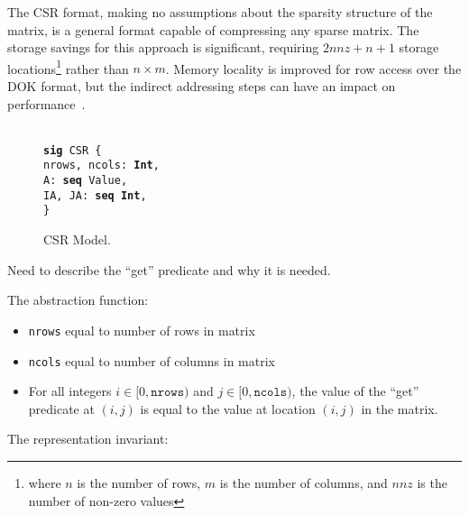 \documentclass[11pt,conference]{IEEEtran}
\newenvironment{myquote}{\list{}{\leftmargin=12pt\rightmargin=0pt}\item[]}{\endlist}
\def\TA{\makebox[12pt]{}}
\def\Bsig{\textbf{sig} }
\def\Bseq{\textbf{seq} }
\def\Bint{\textbf{Int}}
\begin{document}
The CSR format, making no assumptions about the sparsity structure of the matrix, is a general format capable of compressing any sparse matrix.  The storage savings for this approach is significant, requiring $2nnz+n+1$ storage locations\footnote{where $n$ is the number of rows, $m$ is the number of columns, and $nnz$ is the number of non-zero values} rather than $n \times m$.  Memory locality is improved for row access over the DOK format, but the indirect addressing steps can have an impact on performance~\cite{bai}.

\begin{figure}
\centering
\begin{myquote}\small{\texttt{\\
\Bsig CSR \{\\
\TA  nrows, ncols: \Bint,\\
\TA  A: \Bseq Value,\\
\TA  IA, JA: \Bseq \Bint,\\
\}
}}
\end{myquote}
\caption{CSR Model.}
\label{model:yale}
\end{figure}

Need to describe the ``get'' predicate and why it is needed.

The abstraction function:

\begin{itemize}
  \item \texttt{nrows} equal to number of rows in matrix
  \item \texttt{ncols} equal to number of columns in matrix
  \item For all integers $i \in [0, \texttt{nrows})$ and $j \in [0, \texttt{ncols})$, the value of the ``get'' predicate at \((i, j)\) is equal to the value at location \((i, j)\) in the matrix.
\end{itemize}

The representation invariant:
\end{document}
